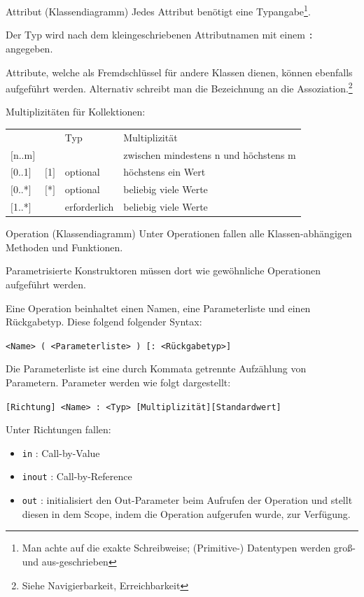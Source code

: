 \begin{defi}{Attribut (Klassendiagramm)}
    Jedes Attribut benötigt eine Typangabe\footnote{Man achte auf die exakte Schreibweise; (Primitive-) Datentypen werden groß- und aus-geschrieben}.

    Der Typ wird nach dem kleingeschriebenen Attributnamen mit einem \texttt{:} angegeben.

    Attribute, welche als Fremdschlüssel für andere Klassen dienen, können ebenfalls aufgeführt werden.
    Alternativ schreibt man die Bezeichnung an die Assoziation.\footnote{Siehe Navigierbarkeit, Erreichbarkeit}

    Multiplizitäten für Kollektionen:

    \begin{tabular}{>{\ttfamily}l>{\ttfamily}lll}
        \multicolumn{1}{l}{Symbol} & \multicolumn{1}{l}{alternativ} & Typ          & {Multiplizität}                       \\
        $[$n..m$]$                 &                                &              & zwischen mindestens n und höchstens m \\
        $[$0..1$]$                 & $[$1$]$                        & optional     & höchstens ein Wert                    \\
        $[$0..*$]$                 & $[$*$]$                        & optional     & beliebig viele Werte                  \\
        $[$1..*$]$                 &                                & erforderlich & beliebig viele Werte
    \end{tabular}
\end{defi}

\begin{defi}{Operation (Klassendiagramm)}
    Unter Operationen fallen alle Klassen-abhängigen Methoden und Funktionen.

    Parametrisierte Konstruktoren müssen dort wie gewöhnliche Operationen aufgeführt werden.

    Eine Operation beinhaltet einen Namen, eine Parameterliste und einen Rückgabetyp.
    Diese folgend folgender Syntax:

    \texttt{<Name> ( <Parameterliste> ) [: <Rückgabetyp>]}

    Die Parameterliste ist eine durch Kommata getrennte Aufzählung von Parametern.
    Parameter werden wie folgt dargestellt:

    \texttt{[Richtung] <Name> : <Typ> [Multiplizität][Standardwert]}

    Unter Richtungen fallen:
    \begin{itemize}
        \item \texttt{in} : Call-by-Value
        \item \texttt{inout} : Call-by-Reference
        \item \texttt{out} : initialisiert den Out-Parameter beim Aufrufen der Operation und stellt diesen in dem Scope, indem die Operation aufgerufen wurde, zur Verfügung.
    \end{itemize}
\end{defi}

